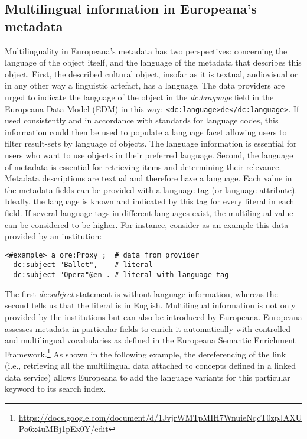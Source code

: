 \subsection{Multilingual information in Europeana's metadata}
\label{section:multilingualinfo}

Multilinguality in Europeana's metadata has two perspectives: concerning the language of the object itself, and the language of the metadata that describes this object. First, the described cultural object, insofar as it is textual, audiovisual or in any other way a linguistic artefact, has a language. The data providers are urged to indicate the language of the object in the \textit{dc:language} field in the Europeana Data Model (EDM) in this way: \texttt{<dc:language>de</dc:language>}. If used consistently and in accordance with standards for language codes, this information could then be used to populate a language facet allowing users to filter result-sets by language of objects. The language information is essential for users who want to use objects in their preferred language. 
Second, the language of metadata is essential for retrieving items and determining their relevance. Metadata descriptions are textual and therefore have a language. Each value in the metadata fields can be provided with a language tag (or language attribute). Ideally, the language is known and indicated by this tag for every literal in each field. If several language tags in different languages exist, the multilingual value can be considered to be higher. For instance, consider as an example this data provided by an institution:

\begingroup
   \fontsize{8pt}{10pt}\selectfont
\begin{verbatim}
<#example> a ore:Proxy ;  # data from provider
  dc:subject "Ballet",    # literal
  dc:subject "Opera"@en . # literal with language tag
\end{verbatim}
\endgroup

The first \textit{dc:subject} statement is without language information, whereas the second tells us that the literal is in English. Multilingual information is not only provided by the institutions but can also be introduced by Europeana.
Europeana assesses metadata in particular fields to enrich it automatically with controlled and multilingual vocabularies as defined in the Europeana Semantic Enrichment Framework.\footnote{\url{https://docs.google.com/document/d/1JvjrWMTpMIH7WnuieNqcT0zpJAXUPo6x4uMBj1pEx0Y/edit}} As shown in the following example, the dereferencing of the link (i.e., retrieving all the multilingual data attached to concepts defined in a linked data service) allows Europeana to add the language variants for this particular keyword to its search index.

